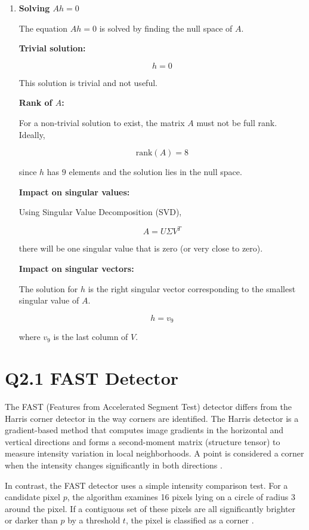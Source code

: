 \documentclass[12pt]{article}
\begin{document}
\begin{enumerate}
\item \textbf{Solving $Ah = 0$}

The equation $Ah = 0$ is solved by finding the null space of $A$.

\textbf{Trivial solution:}

\[
h = 0
\]

This solution is trivial and not useful.

\textbf{Rank of $A$:}

For a non-trivial solution to exist, the matrix $A$ must not be full rank. Ideally,

\[
\text{rank}(A) = 8
\]

since $h$ has $9$ elements and the solution lies in the null space.

\textbf{Impact on singular values:}

Using Singular Value Decomposition (SVD),

\[
A = U\Sigma V^T
\]

there will be one singular value that is zero (or very close to zero).

\textbf{Impact on singular vectors:}

The solution for $h$ is the right singular vector corresponding to the smallest singular value of $A$.

\[
h = v_9
\]

where $v_9$ is the last column of $V$.

\end{enumerate}

\newpage
\section*{Q2.1 FAST Detector}

The FAST (Features from Accelerated Segment Test) detector differs from the Harris corner detector in the way corners are identified. The Harris detector is a gradient-based method that computes image gradients in the horizontal and vertical directions and forms a second-moment matrix (structure tensor) to measure intensity variation in local neighborhoods. A point is considered a corner when the intensity changes significantly in both directions \cite{harris1988combined,szeliski2022computer}.

In contrast, the FAST detector uses a simple intensity comparison test. For a candidate pixel $p$, the algorithm examines 16 pixels lying on a circle of radius 3 around the pixel. If a contiguous set of these pixels are all significantly brighter or darker than $p$ by a threshold $t$, the pixel is classified as a corner \cite{rosten2006machine}.
\end{document}
